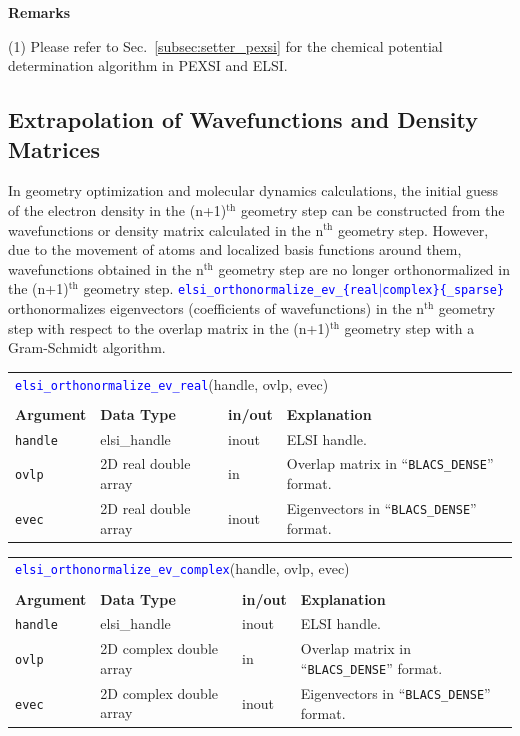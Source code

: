 \documentclass{report}
\newcommand{\api}[1]{\textcolor{blue}{\texttt{#1}}}
\begin{document}
\textbf{Remarks}

(1) Please refer to Sec.~\ref{subsec:setter_pexsi} for the chemical potential determination algorithm in PEXSI and ELSI.

\subsection{Extrapolation of Wavefunctions and Density Matrices}
\label{subsec:extrapolation}
In geometry optimization and molecular dynamics calculations, the initial guess of the electron density in the (n+1)$^\text{th}$ geometry step can be constructed from the wavefunctions or density matrix calculated in the n$^\text{th}$ geometry step. However, due to the movement of atoms and localized basis functions around them, wavefunctions obtained in the n$^\text{th}$ geometry step are no longer orthonormalized in the (n+1)$^\text{th}$ geometry step. \api{elsi\_orthonormalize\_ev\_\{real$\vert$complex\}\{\_sparse\}} orthonormalizes eigenvectors (coefficients of wavefunctions) in the n$^\text{th}$ geometry step with respect to the overlap matrix in the (n+1)$^\text{th}$ geometry step with a Gram-Schmidt algorithm.

\begin{tabular}[]{|p{20mm}|p{40mm}|p{10mm}|p{92mm}|}
\multicolumn{4}{l}{\api{elsi\_orthonormalize\_ev\_real}(handle, ovlp, evec)}\\
\multicolumn{4}{l}{}\\
\hline
\multicolumn{1}{|l|}{\textbf{Argument}} & \multicolumn{1}{l|}{\textbf{Data Type}} & \multicolumn{1}{l|}{\textbf{in/out}} & \multicolumn{1}{l|}{\textbf{Explanation}}\\
\hline
\texttt{handle} & elsi\_handle         & inout & ELSI handle.\\
\hline
\texttt{ovlp}   & 2D real double array & in    & Overlap matrix in ``\texttt{BLACS\_DENSE}'' format.\\
\hline
\texttt{evec}   & 2D real double array & inout & Eigenvectors in ``\texttt{BLACS\_DENSE}'' format.\\
\hline
\end{tabular}

\begin{tabular}[]{|p{20mm}|p{40mm}|p{10mm}|p{92mm}|}
\multicolumn{4}{l}{\api{elsi\_orthonormalize\_ev\_complex}(handle, ovlp, evec)}\\
\multicolumn{4}{l}{}\\
\hline
\multicolumn{1}{|l|}{\textbf{Argument}} & \multicolumn{1}{l|}{\textbf{Data Type}} & \multicolumn{1}{l|}{\textbf{in/out}} & \multicolumn{1}{l|}{\textbf{Explanation}}\\
\hline
\texttt{handle} & elsi\_handle            & inout & ELSI handle.\\
\hline
\texttt{ovlp}   & 2D complex double array & in    & Overlap matrix in ``\texttt{BLACS\_DENSE}'' format.\\
\hline
\texttt{evec}   & 2D complex double array & inout & Eigenvectors in ``\texttt{BLACS\_DENSE}'' format.\\
\hline
\end{tabular}
\end{document}
